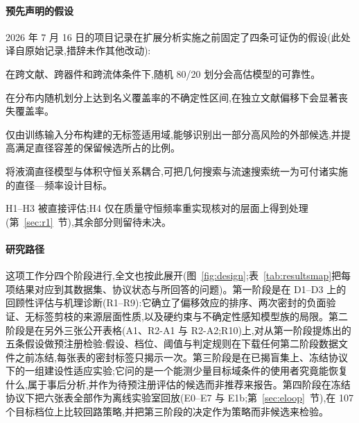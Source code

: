 \documentclass[11pt,a4paper]{ctexart}
\begin{document}
\paragraph{预先声明的假设} 2026 年 7 月 16 日的项目记录在扩展分析实施之前固定了四条可证伪的假设(此处译自原始记录,措辞未作其他改动):

\begin{description}[leftmargin=*,itemsep=1pt]
\item[H1] 在跨文献、跨器件和跨流体条件下,随机 80/20 划分会高估模型的可靠性。
\item[H2] 在分布内随机划分上达到名义覆盖率的不确定性区间,在独立文献偏移下会显著丧失覆盖率。
\item[H3] 仅由训练输入分布构建的无标签适用域,能够识别出一部分高风险的外部候选,并提高满足直径容差的保留候选所占的比例。
\item[H4] 将液滴直径模型与体积守恒关系耦合,可把几何搜索与流速搜索统一为可付诸实施的直径—频率设计目标。
\end{description}

H1–H3 被直接评估;H4 仅在质量守恒频率重实现核对的层面上得到处理(第~\ref{sec:r1}~节),其余部分则留待未决。

\paragraph{研究路径} 这项工作分四个阶段进行,全文也按此展开(图~\ref{fig:design};表~\ref{tab:resultsmap}把每项结果对应到其数据集、协议状态与所回答的问题)。第一阶段是在 D1--D3 上的回顾性评估与机理诊断(R1--R9):它确立了偏移效应的排序、两次密封的负面验证、无标签剪枝的来源层面性质,以及硬约束与不确定性感知模型族的局限。第二阶段是在另外三张公开表格(A1、R2-A1 与 R2-A2;R10)上,对从第一阶段提炼出的五条假设做预注册检验:假设、档位、阈值与判定规则在下载任何第二阶段数据文件之前冻结,每张表的密封标签只揭示一次。第三阶段是在已揭盲集上、冻结协议下的一组建设性适应实验;它问的是一个能测少量目标域条件的使用者究竟能恢复什么,属于事后分析,并作为待预注册评估的候选而非推荐来报告。第四阶段在冻结协议下把六张表全部作为离线实验室回放(E0--E7 与 E1b;第~\ref{sec:eloop}~节),在 107 个目标档位上比较回路策略,并把第三阶段的决定作为策略而非候选来检验。
\end{document}
